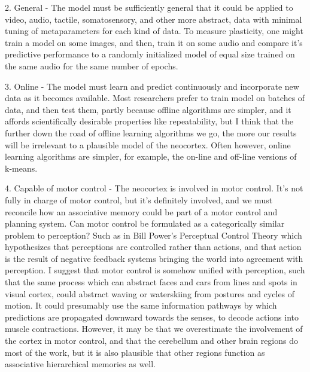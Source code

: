\documentclass[12pt]{article}
\begin{document}
2. General - The model must be sufficiently general that it could be applied to video, audio, tactile, somatosensory, and other more abstract, data with minimal tuning of metaparameters for each kind of data. To measure plasticity, one might train a model on some images, and then, train it on some audio and compare it's predictive performance to a randomly initialized model of equal size trained on the same audio for the same number of epochs.

3. Online - The model must learn and predict continuously and incorporate new data as it becomes available. Most researchers prefer to train model on batches of data, and then test them, partly because offline algorithms are simpler, and it affords scientifically desirable properties like repeatability, but I think that the further down the road of offline learning algorithms we go, the more our results will be irrelevant to a plausible model of the neocortex. Often however, online learning algorithms are simpler, for example, the on-line and off-line versions of k-means.

4. Capable of motor control - The neocortex is involved in motor control. It's not fully in charge of motor control, but it's definitely involved, and we must reconcile how an associative memory could be part of a motor control and planning system. Can motor control be formulated as a categorically similar problem to perception? Such as in Bill Power's Perceptual Control Theory which hypothesizes that perceptions are controlled rather than actions, and that action is the result of negative feedback systems bringing the world into agreement with perception. I suggest that motor control is somehow unified with perception, such that the same process which can abstract faces and cars from lines and spots in visual cortex, could abstract waving or waterskiing from postures and cycles of motion. It could presumably use the same information pathways by which predictions are propagated downward towards the senses, to decode actions into muscle contractions. However, it may be that we overestimate the involvement of the cortex in motor control, and that the cerebellum and other brain regions do most of the work, but it is also plausible that other regions function as associative hierarchical memories as well.
\end{document}
